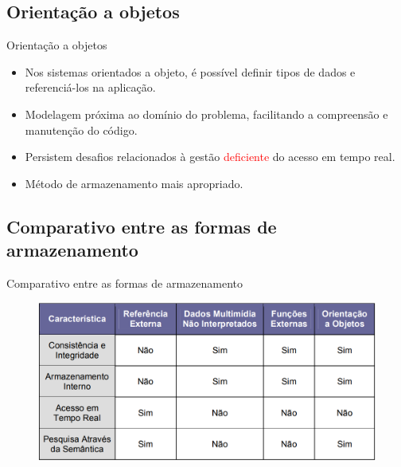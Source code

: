 \documentclass{beamer}
\begin{document}
    \subsection{Orientação a objetos}
        \begin{frame}{Orientação a objetos}
            \begin{itemize}
                \item Nos sistemas orientados a objeto, é possível definir tipos de dados e referenciá-los na aplicação.
                \pause \item Modelagem próxima ao domínio do problema, facilitando a compreensão e manutenção do código.
                \pause \item Persistem desafios relacionados à gestão \textcolor{red}{deficiente} do acesso em tempo real.
                \pause \item Método de armazenamento mais apropriado.
            \end{itemize}
        \end{frame}

    \subsection{Comparativo entre as formas de armazenamento}
        \begin{frame}{Comparativo entre as formas de armazenamento}
            \begin{figure}[htpb]
                \includegraphics[width=1\linewidth]{pic/image.jpg}
            \end{figure}
        \end{frame}
    
\end{document}
